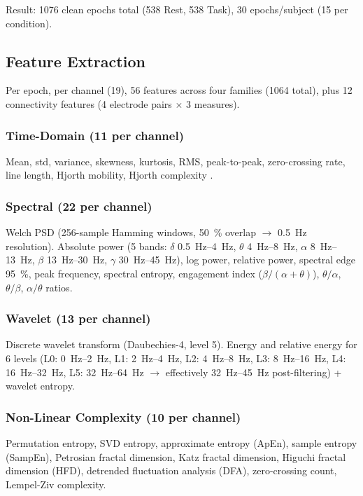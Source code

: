 \documentclass[conference]{IEEEtran}
\begin{document}
Result: \num{1076} clean epochs total (\num{538} Rest, \num{538} Task), \texttildelow\num{30} epochs/subject (\texttildelow\num{15} per condition).

\subsection{Feature Extraction}
\label{sec:features}
Per epoch, per channel (\num{19}), \num{56} features across four families (\num{1064} total), plus \num{12} connectivity features (\num{4} electrode pairs $\times$ \num{3} measures).

\subsubsection{Time-Domain (\num{11} per channel)}
Mean, std, variance, skewness, kurtosis, RMS, peak-to-peak, zero-crossing rate, line length, Hjorth mobility, Hjorth complexity \cite{hjorth1970eeg}.

\subsubsection{Spectral (\num{22} per channel)}
Welch PSD (\num{256}-sample Hamming windows, \SI{50}{\%} overlap $\rightarrow$ \SI{0.5}{\hertz} resolution). Absolute power (5 bands: $\delta$ \SIrange{0.5}{4}{\hertz}, $\theta$ \SIrange{4}{8}{\hertz}, $\alpha$ \SIrange{8}{13}{\hertz}, $\beta$ \SIrange{13}{30}{\hertz}, $\gamma$ \SIrange{30}{45}{\hertz}), log power, relative power, spectral edge \SI{95}{\%}, peak frequency, spectral entropy, engagement index ($\beta/(\alpha+\theta)$), $\theta/\alpha$, $\theta/\beta$, $\alpha/\theta$ ratios.

\subsubsection{Wavelet (\num{13} per channel)}
Discrete wavelet transform (Daubechies-4, level \num{5}). Energy and relative energy for 6 levels (L0: \SIrange{0}{2}{\hertz}, L1: \SIrange{2}{4}{\hertz}, L2: \SIrange{4}{8}{\hertz}, L3: \SIrange{8}{16}{\hertz}, L4: \SIrange{16}{32}{\hertz}, L5: \SIrange{32}{64}{\hertz} $\rightarrow$ effectively \SIrange{32}{45}{\hertz} post-filtering) + wavelet entropy.

\subsubsection{Non-Linear Complexity (\num{10} per channel)}
Permutation entropy, SVD entropy, approximate entropy (ApEn), sample entropy (SampEn), Petrosian fractal dimension, Katz fractal dimension, Higuchi fractal dimension (HFD), detrended fluctuation analysis (DFA), zero-crossing count, Lempel-Ziv complexity.
\end{document}
